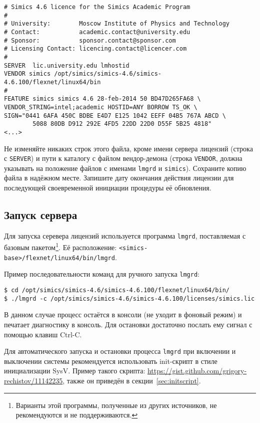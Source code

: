 \begin{lstlisting}
# Simics 4.6 licence for the Simics Academic Program
#
# University:        Moscow Institute of Physics and Technology
# Contact:           academic.contact@university.edu
# Sponsor:           sponsor.contact@sponsor.com
# Licensing Contact: licencing.contact@licencer.com
#
SERVER  lic.university.edu lmhostid
VENDOR simics /opt/simics/simics-4.6/simics-4.6.100/flexnet/linux64/bin
#
FEATURE simics simics 4.6 28-feb-2014 50 BD47D265FA68 \
VENDOR_STRING=intel;academic HOSTID=ANY BORROW TS_OK \
SIGN="0441 6AFA 450C BDBE E4D7 E125 1042 EEFF 04B5 767A ABCD \
        5088 80DB D912 292E 4FD5 22DD 22D0 D55F 5B25 4818"
<...>
\end{lstlisting}

Не изменяйте никаких строк этого файла, кроме имени сервера лицензий (строка с \texttt{SERVER}) и пути к каталогу с файлом вендор-демона (строка \texttt{VENDOR}, должна указывать на положение файлов с именами \texttt{lmgrd} и \texttt{simics}). Сохраните копию файла в надёжном месте. Запишите дату окончания действия лицензии для последующей своевременной инициации процедуры её обновления.

\subsection{Запуск сервера}

Для запуска серевера лицензий используется программа \texttt{lmgrd}, поставляемая с базовым пакетом\footnote{Варианты этой программы, полученные из других источников, не рекомендуются и не поддерживаются.}. Её расположение: \texttt{<simics-base>/flexnet/linux64/bin/lmgrd}.

Пример последовательности команд для ручного запуска \texttt{lmgrd}:
\begin{lstlisting}
$ cd /opt/simics/simics-4.6/simics-4.6.100/flexnet/linux64/bin/
$ ./lmgrd -c /opt/simics/simics-4.6/simics-4.6.100/licenses/simics.lic
\end{lstlisting}

В данном случае процесс остаётся в консоли (не уходит в фоновый режим) и печатает диагностику в консоль. Для остановки достаточно послать ему сигнал с помощью клавиш Ctrl-C.

Для автоматического запуска и остановки процесса \texttt{lmgrd} при включении и выключении системы рекомендуется использовать init-скрипт в стиле инициализации SysV. Пример такого скрипта: \url{https://gist.github.com/grigory-rechistov/11142235}, также он приведён в секции~\ref{sec:initscript}.

